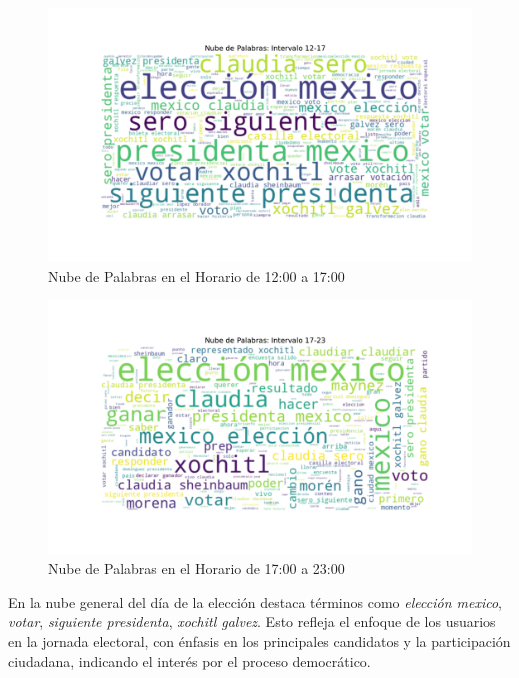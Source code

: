\documentclass[10pt, a4paper]{article}
\begin{document}
	\vspace{-10mm}
	\begin{figure}[h!]
		\centering
		\includegraphics[width=1\textwidth]{nube_intervalo_12-17.pdf} %
		\vspace{-22mm}
		\caption{Nube de Palabras en el Horario de 12:00 a 17:00}
		\label{fig:nubeIntervalo1217} %
	\end{figure}
	
	\newpage
	
	\begin{figure}[h!]
		\centering
		\includegraphics[width=1\textwidth]{nube_intervalo_17-23.pdf} %
		\vspace{-22mm}
		\caption{Nube de Palabras en el Horario de 17:00 a 23:00}
		\label{fig:nubeIntervalo1723} %
	\end{figure}
	
	

	En la nube general del día de la elección destaca términos como \textit{elección mexico}, \textit{votar}, \textit{siguiente presidenta}, \textit{xochitl galvez}. Esto refleja el enfoque de los usuarios en la jornada electoral, con énfasis en los principales candidatos y la participación ciudadana, indicando el interés por el proceso democrático.
	
\end{document}
